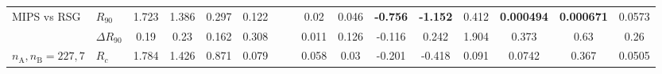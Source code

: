 \begin{tabular}{@{} ll @{\quad } S[round-mode=places]S[round-mode=places] S[round-mode=places]S[round-mode=places] SS SS @{\quad\quad\quad} SSS[round-mode=places] @{\quad} S@{}S@{}S @{}}
\addlinespace
MIPS vs RSG & \(R_{90}\) & 1.723 & 1.386 & 0.297 & 0.122 &   &   & 0.02 & 0.046 & \bfseries -0.756 & \bfseries -1.152 & 0.412 & \bfseries 0.000494 & \bfseries 0.000671 & 0.0573\\
 & \(\Delta R_{90}\) & 0.19 & 0.23 & 0.162 & 0.308 &   &   & 0.011 & 0.126 & -0.116 & 0.242 & 1.904 & 0.373 & 0.63 & 0.26\\
\(n_{\text{A}}, n_{\text{B}} = 227, 7\) & \(R_{c}\) & 1.784 & 1.426 & 0.871 & 0.079 &   &   & 0.058 & 0.03 & -0.201 & -0.418 & 0.091 & 0.0742 & 0.367 & 0.0505
\\
\bottomrule
\end{tabular}

